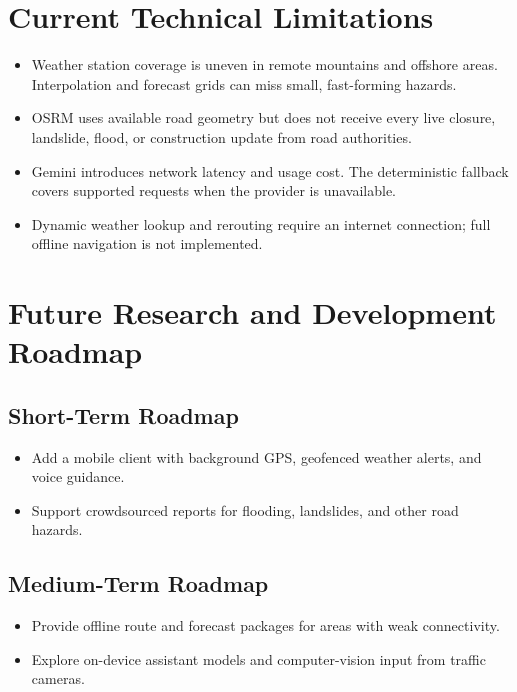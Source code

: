 \section{Current Technical Limitations}
\label{sec:limitations}

\begin{itemize}
    \item[-] Weather station coverage is uneven in remote mountains and offshore areas. Interpolation and forecast grids can miss small, fast-forming hazards.
    \item[-] OSRM uses available road geometry but does not receive every live closure, landslide, flood, or construction update from road authorities.
    \item[-] Gemini introduces network latency and usage cost. The deterministic fallback covers supported requests when the provider is unavailable.
    \item[-] Dynamic weather lookup and rerouting require an internet connection; full offline navigation is not implemented.
\end{itemize}

\section{Future Research and Development Roadmap}
\label{sec:future_work}

\subsection{Short-Term Roadmap}
\begin{itemize}
    \item[-] Add a mobile client with background GPS, geofenced weather alerts, and voice guidance.
    \item[-] Support crowdsourced reports for flooding, landslides, and other road hazards.
\end{itemize}

\subsection{Medium-Term Roadmap}
\begin{itemize}
    \item[-] Provide offline route and forecast packages for areas with weak connectivity.
    \item[-] Explore on-device assistant models and computer-vision input from traffic cameras.
\end{itemize}

